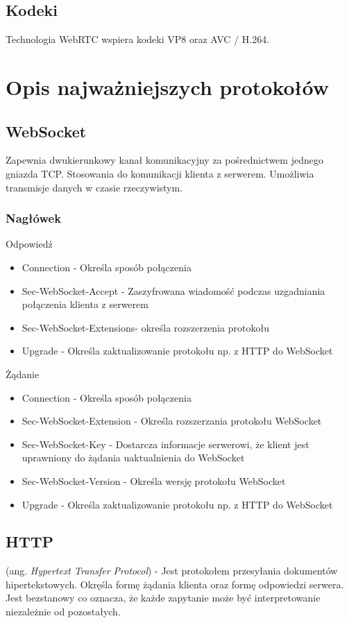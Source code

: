 \documentclass{article}
\begin{document}
\subsection{Kodeki}
Technologia WebRTC wspiera kodeki VP8 oraz AVC / H.264.

\section{Opis najważniejszych protokołów}

\subsection{WebSocket}
Zapewnia dwukierunkowy kanał komunikacyjny za pośrednictwem jednego gniazda TCP. Stosowania do komunikacji klienta z serwerem. Umożliwia transmisje danych w czasie rzeczywistym.

\subsubsection{Nagłówek}

Odpowiedź
\begin{itemize}
  \item Connection - Określa sposób połączenia
  \item Sec-WebSocket-Accept - Zaszyfrowana wiadomość podczas uzgadniania połączenia klienta z serwerem
  \item Sec-WebSocket-Extensions- określa rozszerzenia protokołu
  \item Upgrade - Określa zaktualizowanie protokołu np. z HTTP do WebSocket
\end{itemize}

Żądanie
\begin{itemize}
  \item Connection - Określa sposób połączenia
  \item Sec-WebSocket-Extension - Określa rozszerzania protokołu WebSocket
  \item Sec-WebSocket-Key - Dostarcza informacje serwerowi, że klient jest uprawniony do żądania uaktualnienia do WebSocket
  \item Sec-WebSocket-Version - Określa wersję protokołu WebSocket
  \item Upgrade - Określa zaktualizowanie protokołu np. z HTTP do WebSocket
\end{itemize}

\subsection{HTTP}
(ang. \emph{Hypertext Transfer Protocol}) - Jest protokołem przesyłania dokumentów hipertekstowych. Okręśla formę żądania klienta oraz formę odpowiedzi serwera. Jest bezstanowy co oznacza, że każde zapytanie może być interpretowanie niezależnie od pozostałych.
\end{document}
